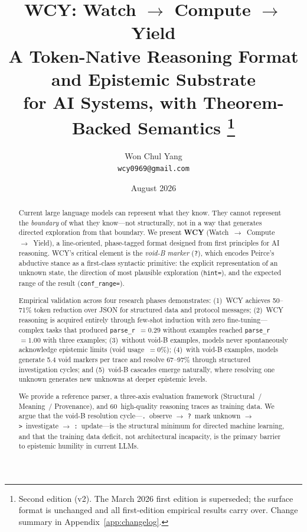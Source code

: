 \documentclass[11pt,a4paper]{article}
\title{%
  \textbf{WCY: Watch $\to$ Compute $\to$ Yield}\\[4pt]
  \large A Token-Native Reasoning Format and Epistemic Substrate\\
  for AI Systems, with Theorem-Backed Semantics%
  \thanks{Second edition (v2). The March 2026 first edition is superseded;
  the surface format is unchanged and all first-edition empirical results
  carry over. Change summary in Appendix~\ref{app:changelog}.}
}
\author{%
  Won Chul Yang\\[2pt]
  \small \texttt{wcy0969@gmail.com}
}
\date{August 2026}
\begin{document}
\maketitle
\thispagestyle{empty}

\begin{abstract}
Current large language models can represent what they know. They cannot represent the \emph{boundary} of what they know---not structurally, not in a way that generates directed exploration from that boundary. We present \textbf{WCY} (Watch~$\to$~Compute~$\to$~Yield), a line-oriented, phase-tagged format designed from first principles for AI reasoning. WCY's critical element is the \emph{void-B marker} (\texttt{?}), which encodes Peirce's abductive stance as a first-class syntactic primitive: the explicit representation of an unknown state, the direction of most plausible exploration (\texttt{hint=}), and the expected range of the result (\texttt{conf\_range=}).

Empirical validation across four research phases demonstrates: (1)~WCY achieves 50--71\% token reduction over JSON for structured data and protocol messages; (2)~WCY reasoning is acquired entirely through few-shot induction with zero fine-tuning---complex tasks that produced \texttt{parse\_r}~$= 0.29$ without examples reached \texttt{parse\_r}~$= 1.00$ with three examples; (3)~without void-B examples, models never spontaneously acknowledge epistemic limits (void usage~$= 0\%$); (4)~with void-B examples, models generate 5.4 void markers per trace and resolve 67--97\% through structured investigation cycles; and (5)~void-B cascades emerge naturally, where resolving one unknown generates new unknowns at deeper epistemic levels.

We provide a reference parser, a three-axis evaluation framework (Structural~/ Meaning~/ Provenance), and 60~high-quality reasoning traces as training data. We argue that the void-B resolution cycle---\texttt{.}~observe $\to$ \texttt{?}~mark unknown $\to$ \texttt{>}~investigate $\to$ \texttt{:}~update---is the structural minimum for directed machine learning, and that the training data deficit, not architectural incapacity, is the primary barrier to epistemic humility in current LLMs.


\end{abstract}
\end{document}
